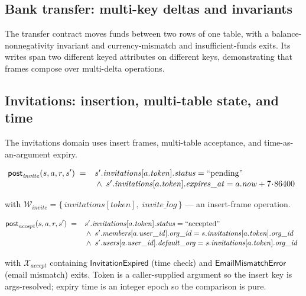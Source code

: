 \documentclass[11pt,a4paper]{article}
\begin{document}
\subsection{Bank transfer: multi-key deltas and invariants}

The transfer contract moves funds between two rows of one table, with
a balance-nonnegativity invariant and currency-mismatch and
insufficient-funds exits.  Its writes span two different keyed
attributes on different keys, demonstrating that frames compose over
multi-delta operations.

\subsection{Invitations: insertion, multi-table state, and time}

The invitations domain uses insert frames, multi-table acceptance,
and time-as-an-argument expiry.

\[
\mathsf{post}_{\mathit{invite}}(s,a,r,s') \;=\;
\begin{array}[t]{l}
s'.\mathit{invitations}[a.\mathit{token}].\mathit{status} = \text{``pending''} \\[1pt]
{}\wedge\; s'.\mathit{invitations}[a.\mathit{token}].\mathit{expires\_at}
       = a.\mathit{now} + 7\!\cdot\!86400
\end{array}
\]

with $\mathcal{W}_{\mathit{invite}} = \{\,\mathit{invitations}[token],\;
\mathit{invite\_log}\,\}$ --- an insert-frame operation.

\[
\mathsf{post}_{\mathit{accept}}(s,a,r,s') \;=\;
\begin{array}[t]{l}
s'.\mathit{invitations}[a.\mathit{token}].\mathit{status} = \text{``accepted''} \\[1pt]
{}\wedge\; s'.\mathit{members}[a.\mathit{user\_id}].\mathit{org\_id}
       = s.\mathit{invitations}[a.\mathit{token}].\mathit{org\_id} \\[1pt]
{}\wedge\; s'.\mathit{users}[a.\mathit{user\_id}].\mathit{default\_org}
       = s.\mathit{invitations}[a.\mathit{token}].\mathit{org\_id}
\end{array}
\]

with $\mathcal{X}_{\mathit{accept}}$ containing
$\mathsf{InvitationExpired}$ (time check) and
$\mathsf{EmailMismatchError}$ (email mismatch) exits.  Token is a
caller-supplied argument so the insert key is args-resolved; expiry
time is an integer epoch so the comparison is pure.
\end{document}
